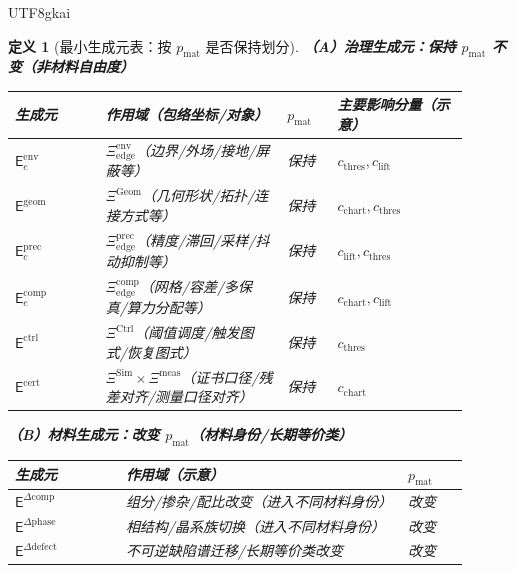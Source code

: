 \documentclass[12pt]{article}
\newtheorem{definition}{定义}[section]
\begin{document}
\begin{CJK*}{UTF8}{gkai}
\begin{definition}[最小生成元表：按 $p_{\mathrm{mat}}$ 是否保持划分]
\textbf{（A）治理生成元：保持 $p_{\mathrm{mat}}$ 不变（非材料自由度）}
\begin{center}
\footnotesize
\renewcommand{\arraystretch}{1.15}
\begin{tabular}{|p{0.18\linewidth}|p{0.36\linewidth}|p{0.10\linewidth}|p{0.26\linewidth}|}
\hline
生成元 & 作用域（包络坐标/对象） & $p_{\mathrm{mat}}$ & 主要影响分量（示意）\\
\hline
$\mathsf{E}^{\mathrm{env}}_{e}$ & $\Xi^{\mathrm{env}}_{\mathrm{edge}}$（边界/外场/接地/屏蔽等） & 保持 & $c_{\mathrm{thres}},
  c_{\mathrm{lift}}$\\
\hline
$\mathsf{E}^{\mathrm{geom}}$ & $\Xi^{\mathrm{Geom}}$（几何形状/拓扑/连接方式等） & 保持 & $c_{\mathrm{chart}},c_{\mathrm{thres}}$\\
\hline
$\mathsf{E}^{\mathrm{prec}}_{e}$ & $\Xi^{\mathrm{prec}}_{\mathrm{edge}}$（精度/滞回/采样/抖动抑制等） & 保持 & $c_{\mathrm{lift}},
  c_{\mathrm{thres}}$\\
\hline
$\mathsf{E}^{\mathrm{comp}}_{e}$ & $\Xi^{\mathrm{comp}}_{\mathrm{edge}}$（网格/容差/多保真/算力分配等） & 保持 & $c_{\mathrm{chart}},
  c_{\mathrm{lift}}$\\
\hline
$\mathsf{E}^{\mathrm{ctrl}}$ & $\Xi^{\mathrm{Ctrl}}$（阈值调度/触发图式/恢复图式） & 保持 & $c_{\mathrm{thres}}$\\
\hline
$\mathsf{E}^{\mathrm{cert}}$ & $\Xi^{\mathrm{Sim}}\times\Xi^{\mathrm{meas}}$（证书口径/残差对齐/测量口径对齐） & 保持 & $c_{\mathrm{chart}}
  $\\
\hline
\end{tabular}
\end{center}

\textbf{（B）材料生成元：改变 $p_{\mathrm{mat}}$（材料身份/长期等价类）}
\begin{center}
\footnotesize
\renewcommand{\arraystretch}{1.15}
\begin{tabular}{|p{0.22\linewidth}|p{0.56\linewidth}|p{0.12\linewidth}|}
\hline
生成元 & 作用域（示意） & $p_{\mathrm{mat}}$\\
\hline
$\mathsf{E}^{\Delta\mathrm{comp}}$ & 组分/掺杂/配比改变（进入不同材料身份） & 改变\\
\hline
$\mathsf{E}^{\Delta\mathrm{phase}}$ & 相结构/晶系族切换（进入不同材料身份） & 改变\\
\hline
$\mathsf{E}^{\Delta\mathrm{defect}}$ & 不可逆缺陷谱迁移/长期等价类改变 & 改变\\
\hline
\end{tabular}
\end{center}


\end{definition}
\end{CJK*}
\end{document}
